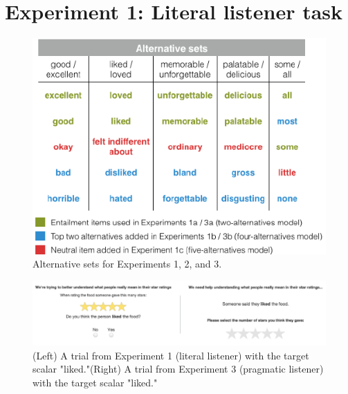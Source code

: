 \documentclass[10pt, letterpaper]{article}
\newenvironment{CodeChunk}{}{}
\begin{document}
\section{Experiment 1: Literal listener
task}\label{experiment-1-literal-listener-task}

\begin{CodeChunk}
\begin{figure}[t]
\includegraphics{figs/allScalesTable-1} \caption[Alternative sets for Experiments 1, 2, and 3]{Alternative sets for Experiments 1, 2, and 3.}\label{fig:allScalesTable}
\end{figure}
\end{CodeChunk}

\begin{CodeChunk}
\captionsetup{width=0.8\textwidth}\begin{figure}[t]

{\centering \includegraphics{figs/stimuli_exp1-1} 

}

\caption[(Left) A trial from Experiment 1 (literal listener) with the target scalar "liked]{(Left) A trial from Experiment 1 (literal listener) with the target scalar "liked."(Right) A trial from Experiment 3 (pragmatic listener) with the target scalar "liked."}\label{fig:stimuli_exp1}
\end{figure}
\end{CodeChunk}
\end{document}
